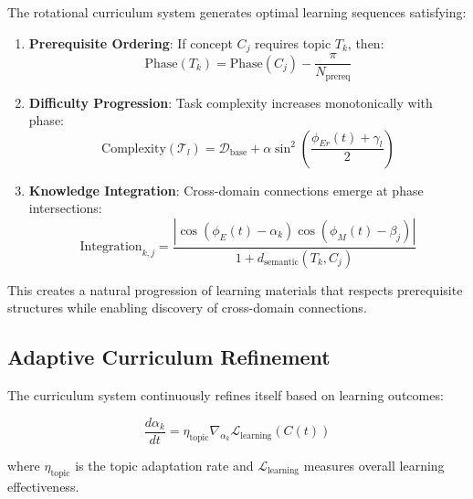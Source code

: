 \begin{theorem}
\label{thm:curriculum_progression}
The rotational curriculum system generates optimal learning sequences satisfying:

\begin{enumerate}
    \item \textbf{Prerequisite Ordering}: If concept $C_j$ requires topic $T_k$, then:
    \begin{equation}
    \text{Phase}(T_k) = \text{Phase}(C_j) - \frac{\pi}{N_{\text{prereq}}}
    \end{equation}
    
    \item \textbf{Difficulty Progression}: Task complexity increases monotonically with phase:
    \begin{equation}
    \text{Complexity}(\mathcal{T}_l) = \mathcal{D}_{\text{base}} + \alpha \sin^2\left(\frac{\phi_{Er}(t) + \gamma_l}{2}\right)
    \end{equation}
    
    \item \textbf{Knowledge Integration}: Cross-domain connections emerge at phase intersections:
    \begin{equation}
    \text{Integration}_{k,j} = \frac{|\cos(\phi_E(t) - \alpha_k) \cos(\phi_M(t) - \beta_j)|}{1 + d_{\text{semantic}}(T_k, C_j)}
    \end{equation}
\end{enumerate}

This creates a natural progression of learning materials that respects prerequisite structures while enabling discovery of cross-domain connections.
\end{theorem}

\subsection{Adaptive Curriculum Refinement}

The curriculum system continuously refines itself based on learning outcomes:

\begin{equation}
\frac{d\alpha_k}{dt} = \eta_{\text{topic}} \nabla_{\alpha_k} \mathcal{L}_{\text{learning}}(C(t))
\end{equation}

where $\eta_{\text{topic}}$ is the topic adaptation rate and $\mathcal{L}_{\text{learning}}$ measures overall learning effectiveness.

